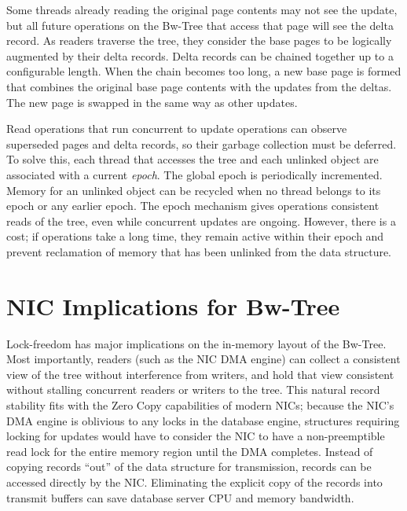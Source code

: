 Some threads already reading the original page contents may not see
the update, but all future operations on the Bw-Tree that access that page
will see the delta record. As readers traverse the tree, they consider
the base pages to be logically augmented by their delta records. Delta records
can be chained together up to a configurable length.  When the chain becomes
too long, a new base page is formed that combines the original base page
contents with the updates from the deltas. The new page is swapped in
the same way as other updates.

Read operations that run concurrent to update operations can observe superseded
pages and delta records, so their garbage collection must be deferred.
To solve this, each thread that
accesses the tree and each unlinked object are associated with a current {\em epoch}.
The global epoch is periodically incremented. Memory for an unlinked object can be
recycled when no thread belongs to its epoch or any earlier epoch.
The epoch mechanism gives operations consistent reads of the
tree, even while concurrent updates are ongoing. However, there is a
cost; if operations take a long time, they remain active within their epoch and
prevent reclamation of memory that has been unlinked from the data structure.


\section{NIC Implications for Bw-Tree}
Lock-freedom has major implications on the in-memory layout of the
Bw-Tree. Most importantly, readers (such as the NIC DMA engine) can collect a
consistent view of the tree without interference from writers, and hold that
view consistent without stalling concurrent readers or writers to the tree.  This
natural record stability fits with the Zero Copy capabilities of modern NICs;
because the NIC's DMA engine is oblivious to any locks in the database engine,
structures requiring locking for updates would have to consider the NIC to
have a non-preemptible read lock for the entire memory region until the DMA completes.
Instead of copying records ``out'' of the data structure for transmission,
records can be accessed directly by the NIC. Eliminating the explicit copy of
the records into transmit buffers can save database server CPU and memory
bandwidth.

